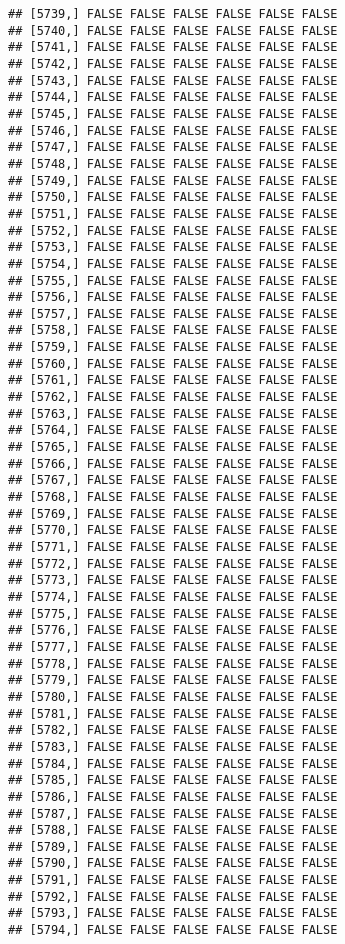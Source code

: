 \documentclass[
]{article}
\begin{document}
\begin{verbatim}
## [5739,] FALSE FALSE FALSE FALSE FALSE FALSE
## [5740,] FALSE FALSE FALSE FALSE FALSE FALSE
## [5741,] FALSE FALSE FALSE FALSE FALSE FALSE
## [5742,] FALSE FALSE FALSE FALSE FALSE FALSE
## [5743,] FALSE FALSE FALSE FALSE FALSE FALSE
## [5744,] FALSE FALSE FALSE FALSE FALSE FALSE
## [5745,] FALSE FALSE FALSE FALSE FALSE FALSE
## [5746,] FALSE FALSE FALSE FALSE FALSE FALSE
## [5747,] FALSE FALSE FALSE FALSE FALSE FALSE
## [5748,] FALSE FALSE FALSE FALSE FALSE FALSE
## [5749,] FALSE FALSE FALSE FALSE FALSE FALSE
## [5750,] FALSE FALSE FALSE FALSE FALSE FALSE
## [5751,] FALSE FALSE FALSE FALSE FALSE FALSE
## [5752,] FALSE FALSE FALSE FALSE FALSE FALSE
## [5753,] FALSE FALSE FALSE FALSE FALSE FALSE
## [5754,] FALSE FALSE FALSE FALSE FALSE FALSE
## [5755,] FALSE FALSE FALSE FALSE FALSE FALSE
## [5756,] FALSE FALSE FALSE FALSE FALSE FALSE
## [5757,] FALSE FALSE FALSE FALSE FALSE FALSE
## [5758,] FALSE FALSE FALSE FALSE FALSE FALSE
## [5759,] FALSE FALSE FALSE FALSE FALSE FALSE
## [5760,] FALSE FALSE FALSE FALSE FALSE FALSE
## [5761,] FALSE FALSE FALSE FALSE FALSE FALSE
## [5762,] FALSE FALSE FALSE FALSE FALSE FALSE
## [5763,] FALSE FALSE FALSE FALSE FALSE FALSE
## [5764,] FALSE FALSE FALSE FALSE FALSE FALSE
## [5765,] FALSE FALSE FALSE FALSE FALSE FALSE
## [5766,] FALSE FALSE FALSE FALSE FALSE FALSE
## [5767,] FALSE FALSE FALSE FALSE FALSE FALSE
## [5768,] FALSE FALSE FALSE FALSE FALSE FALSE
## [5769,] FALSE FALSE FALSE FALSE FALSE FALSE
## [5770,] FALSE FALSE FALSE FALSE FALSE FALSE
## [5771,] FALSE FALSE FALSE FALSE FALSE FALSE
## [5772,] FALSE FALSE FALSE FALSE FALSE FALSE
## [5773,] FALSE FALSE FALSE FALSE FALSE FALSE
## [5774,] FALSE FALSE FALSE FALSE FALSE FALSE
## [5775,] FALSE FALSE FALSE FALSE FALSE FALSE
## [5776,] FALSE FALSE FALSE FALSE FALSE FALSE
## [5777,] FALSE FALSE FALSE FALSE FALSE FALSE
## [5778,] FALSE FALSE FALSE FALSE FALSE FALSE
## [5779,] FALSE FALSE FALSE FALSE FALSE FALSE
## [5780,] FALSE FALSE FALSE FALSE FALSE FALSE
## [5781,] FALSE FALSE FALSE FALSE FALSE FALSE
## [5782,] FALSE FALSE FALSE FALSE FALSE FALSE
## [5783,] FALSE FALSE FALSE FALSE FALSE FALSE
## [5784,] FALSE FALSE FALSE FALSE FALSE FALSE
## [5785,] FALSE FALSE FALSE FALSE FALSE FALSE
## [5786,] FALSE FALSE FALSE FALSE FALSE FALSE
## [5787,] FALSE FALSE FALSE FALSE FALSE FALSE
## [5788,] FALSE FALSE FALSE FALSE FALSE FALSE
## [5789,] FALSE FALSE FALSE FALSE FALSE FALSE
## [5790,] FALSE FALSE FALSE FALSE FALSE FALSE
## [5791,] FALSE FALSE FALSE FALSE FALSE FALSE
## [5792,] FALSE FALSE FALSE FALSE FALSE FALSE
## [5793,] FALSE FALSE FALSE FALSE FALSE FALSE
## [5794,] FALSE FALSE FALSE FALSE FALSE FALSE

\end{verbatim}
\end{document}

